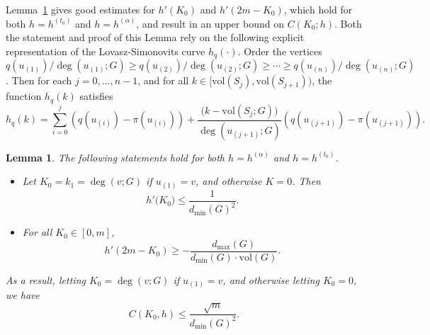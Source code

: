 \documentclass{article}
\newcommand{\vol}{\mathrm{vol}}
\newcommand{\1}{\mathbf{1}}
\newtheorem{lemma}{Lemma}[section]
\theoremstyle{definition}
\theoremstyle{remark}
\begin{document}
Lemma~\ref{lem:linearization_bound} gives good estimates for $h'(K_0)$ and $h'(2m - K_0)$, which hold for both $h = h^{(t_0)}$ and $h = h^{(\alpha)}$, and result in an upper bound on $C(K_0;h)$. Both the statement and proof of this Lemma rely on the following explicit representation of the Lovasz-Simonovits curve $h_q(\cdot)$. Order the vertices $q(u_{(1)})/\deg(u_{(1)};G) \geq q(u_{(2)})/\deg(u_{(2)};G) \geq \cdots \geq q(u_{(n)})/\deg(u_{(n)};G)$. Then for each $j = 0,\ldots,n - 1$, and for all $k \in [\vol(S_j),\vol(S_{j + 1}))$,  the function $h_q(k)$ satisfies
\begin{equation}
\label{eqn:lovasz_simonovits}
h_q(k) = \sum_{i = 0}^{j} \left(q(u_{(i)}) - \pi(u_{(i)})\right) + \frac{\bigl(k - \vol(S_j;G)\bigr)}{\deg(u_{(j + 1)};G)} \left(q(u_{(j+1)}) - \pi(u_{(j+1)})\right). 
\end{equation}
\begin{lemma}
	\label{lem:linearization_bound}
	The following statements hold for both $h = h^{(\alpha)}$ and $h = h^{(t_0)}$. 
	\begin{itemize}
		\item Let $K_0 = k_1 = \deg(v;G)$ if $u_{(1)} = v$, and otherwise $K = 0$. Then  
		\begin{equation}
		\label{eqn:right_derivative_1}
		h'\bigl(K_0\bigr) \leq \frac{1}{d_{\min}(G)^2}.
		\end{equation}
		\item For all $K_0 \in [0,m]$,
		\begin{equation}
		\label{eqn:right_derivative_2}
		h'(2m - K_0) \geq -\frac{d_{\max}(G)}{d_{\min}(G)\cdot \vol(G)}.
		\end{equation}
	\end{itemize}
	As a result, letting $K_0 = \deg(v;G)$ if $u_{(1)} = v$, and otherwise letting $K_0 = 0$, we have
	\begin{equation*}
	C(K_0,h) \leq \frac{\sqrt{m}}{d_{\min}(G)^2}.
	\end{equation*}
\end{lemma}
\end{document}
